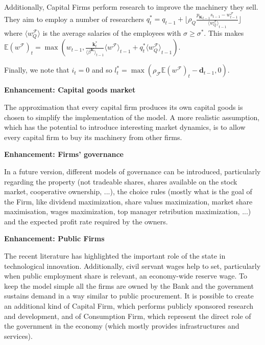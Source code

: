 \documentclass[a4paper, headings=standardclasses]{scrartcl}
\newenvironment{enh}[1][]{\begin{framed}\noindent\textbf{Enhancement: #1}\par}{\end{framed}}
\begin{document}
Additionally, Capital Firms perform research to improve the machinery they sell. They aim to employ a number of researchers $q_t^* = q_{t-1} + \lfloor \rho_Q\frac{{p_\mathbf{K}}_{t-1}s_{t-1} - w^\mathcal{F}_{t-1}}{{\langle w^\mathcal{F}_Q \rangle}_{t-1}} \rfloor$ where $\langle w^\mathcal{F}_Q \rangle$ is the average salaries of the employees with $\sigma \ge \sigma^*$. This makes $\mathbb{E}(w^\mathcal{F})_t = \max(w_{t-1}, \frac{\mathbf{k}^*_t}{{\langle \beta^\mathbf{K} \rangle}_{t-1}}{\langle w^\mathcal{F} \rangle}_{t-1} + q_t^* {\langle w^\mathcal{F}_Q \rangle}_{t-1})$.

Finally, we note that $i_t = 0$ and so $l_t^* = \max(\rho_\mathcal{F} \mathbb{E}(w^\mathcal{F})_t - \mathbf{d}_{t-1}, 0)$.

\begin{enh}[Capital goods market]
    The approximation that every capital firm produces its own capital goods is chosen to simplify the implementation of the model.
    A more realistic assumption, which has the potential to introduce interesting market dynamics, is to allow every capital firm to buy its machinery from other firms.
\end{enh}

\begin{enh}[Firms' governance]
    In a future version, different models of governance can be introduced, particularly regarding the property (not tradeable shares, shares available on the stock market, cooperative ownership, ...), the choice rules (mostly what is the goal of the Firm, like dividend maximization, share values maximization, market share maximisation, wages maximization, top manager retribution maximization, ...) and the expected profit rate required by the owners.
\end{enh}

\begin{enh}[Public Firms]
    The recent literature has highlighted the important role of the state in technological innovation. Additionally, civil servant wages help to set, particularly when public employment share is relevant, an economy-wide reserve wage.
    To keep the model simple all the firms are owned by the Bank and the government sustains demand in a way similar to public procurement.
    It is possible to create an additional kind of Capital Firm, which performs publicly sponsored research and development, and of Consumption Firm, which represent the direct role of the government in the economy (which mostly provides infrastructures and services).
\end{enh}
\end{document}
